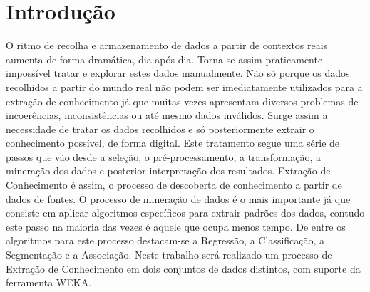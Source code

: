 \section{Introdução}\label{sec:Introduction}

O ritmo de recolha e armazenamento de dados a partir de contextos reais aumenta de forma dramática, dia após dia. Torna-se assim praticamente impossível tratar e explorar estes dados manualmente. Não só porque os dados recolhidos a partir do mundo real não podem ser imediatamente utilizados para a extração de conhecimento já que muitas vezes apresentam diversos problemas de incoerências, inconsistências ou até mesmo dados inválidos. Surge assim a necessidade de tratar os dados recolhidos e só posteriormente extrair o conhecimento possível, de forma digital.
Este tratamento segue uma série de passos que vão desde a seleção, o pré-processamento, a transformação, a mineração dos dados e posterior interpretação dos resultados.
Extração de Conhecimento é assim, o processo de descoberta de conhecimento a partir de dados de fontes.
O processo de mineração de dados é o mais importante já que consiste em aplicar algoritmos específicos para extrair padrões dos dados, contudo este passo na maioria das vezes é aquele que ocupa menos tempo. De entre os algoritmos para este processo destacam-se a Regressão, a Classificação, a Segmentação e a Associação.
\newline
Neste trabalho será realizado um processo de Extração de Conhecimento em dois conjuntos de dados distintos, com suporte da ferramenta WEKA.